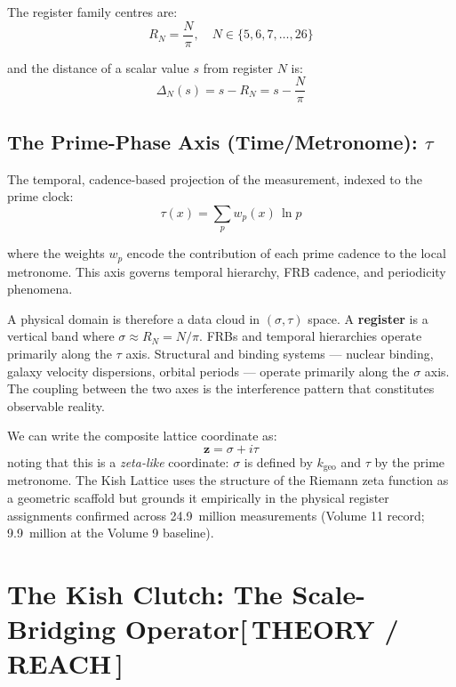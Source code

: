 \documentclass[12pt,oneside]{book}
\newcommand{\TheoryTag}{\;\colorbox{theorytag!15}{\textcolor{theorytag}{\footnotesize\bfseries [\,THEORY / REACH\,]}}}
\begin{document}
The register family centres are:
\begin{equation}
R_N = \frac{N}{\pi}, \quad N \in \{5, 6, 7, \ldots, 26\}
\label{eq:register_centres}
\end{equation}

and the distance of a scalar value $s$ from register $N$ is:
\begin{equation}
\Delta_N(s) = s - R_N = s - \frac{N}{\pi}
\label{eq:register_distance}
\end{equation}

\subsection*{The Prime-Phase Axis (Time/Metronome): $\tau$}

The temporal, cadence-based projection of the measurement, indexed to the prime clock:
\begin{equation}
\tau(x) = \sum_{p} w_p(x)\, \ln p
\label{eq:tau_axis}
\end{equation}

where the weights $w_p$ encode the contribution of each prime cadence to the local
metronome. This axis governs temporal hierarchy, FRB cadence, and periodicity phenomena.

A physical domain is therefore a data cloud in $(\sigma, \tau)$ space. A
\textbf{register} is a vertical band where $\sigma \approx R_N = N/\pi$.
FRBs and temporal hierarchies operate primarily along the $\tau$ axis. Structural
and binding systems — nuclear binding, galaxy velocity dispersions, orbital periods —
operate primarily along the $\sigma$ axis. The coupling between the two axes is
the interference pattern that constitutes observable reality.

We can write the composite lattice coordinate as:
\begin{equation}
\mathbf{z} = \sigma + i\tau
\end{equation}
noting that this is a \emph{zeta-like} coordinate: $\sigma$ is defined by $k_\text{geo}$
and $\tau$ by the prime metronome. The Kish Lattice uses the structure of the
Riemann zeta function as a geometric scaffold but grounds it empirically in the
physical register assignments confirmed across 24.9~million measurements (Volume 11 record; 9.9~million at the Volume 9 baseline).

\section{The Kish Clutch: The Scale-Bridging Operator\TheoryTag}
\end{document}
